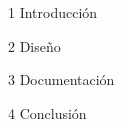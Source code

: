 \documentclass[12pt, a4paper]{article}
\begin{document}
\sffamily


\tableofcontents
\newpage

{1 Introducción}
\newpage

{2 Diseño}
\newpage

{3 Documentación}
\newpage

{4 Conclusión}
\newpage

%
\end{document}
